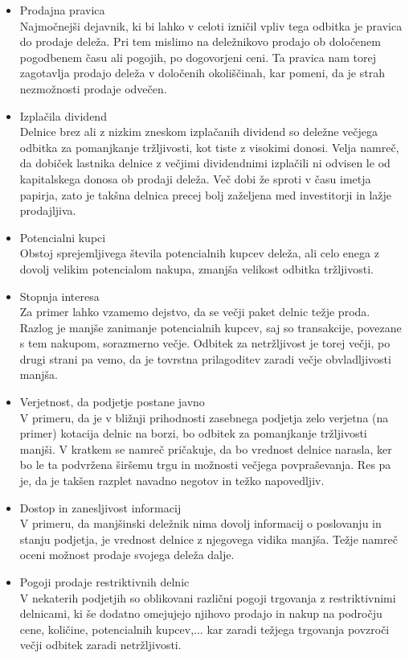 \documentclass[12pt,a4paper]{amsart}
\theoremstyle{definition} %
\theoremstyle{plain} %
\begin{document}
\begin{itemize}
\item Prodajna pravica\\
Najmočnejši dejavnik, ki bi lahko v celoti izničil vpliv tega odbitka je pravica do prodaje deleža. Pri tem mislimo na deležnikovo prodajo ob določenem pogodbenem času ali pogojih, po dogovorjeni ceni. Ta pravica nam torej zagotavlja prodajo deleža v določenih okoliščinah, kar pomeni, da je strah nezmožnosti prodaje odvečen. 
\item Izplačila dividend\\
Delnice brez ali z nizkim zneskom izplačanih dividend so deležne večjega odbitka za pomanjkanje tržljivosti, kot tiste z visokimi donosi. Velja namreč, da dobiček lastnika delnice z večjimi dividendnimi izplačili ni odvisen le od kapitalskega donosa ob prodaji deleža. Več dobi že sproti v času imetja papirja, zato je takšna delnica precej bolj zaželjena med investitorji in lažje prodajljiva. 
\item Potencialni kupci\\
Obstoj sprejemljivega števila potencialnih kupcev deleža, ali celo enega z dovolj velikim potencialom nakupa, zmanjša velikost odbitka tržljivosti. 
\item Stopnja interesa\\
Za primer lahko vzamemo dejstvo, da se večji paket delnic težje proda. Razlog je manjše zanimanje potencialnih kupcev, saj so transakcije, povezane s tem nakupom, sorazmerno večje. Odbitek za netržljivost je torej večji, po drugi strani pa vemo, da je tovrstna prilagoditev zaradi večje obvladljivosti manjša. 
\item Verjetnost, da podjetje postane javno\\
V primeru, da je v bližnji prihodnosti zasebnega podjetja zelo verjetna (na primer) kotacija delnic na borzi, bo odbitek za pomanjkanje tržljivosti manjši. V kratkem se namreč pričakuje, da bo vrednost delnice narasla, ker bo le ta podvržena širšemu trgu in možnosti večjega povpraševanja. Res pa je, da je takšen razplet navadno negotov in težko napovedljiv.
\item Dostop in zanesljivost informacij\\
V primeru, da manjšinski deležnik nima dovolj informacij o poslovanju in stanju podjetja, je vrednost delnice z njegovega vidika manjša. Težje namreč oceni možnost prodaje svojega deleža dalje.
\item Pogoji prodaje restriktivnih delnic\\
V nekaterih podjetjih so oblikovani različni pogoji trgovanja z restriktivnimi delnicami, ki še dodatno omejujejo njihovo prodajo in nakup na področju cene, količine, potencialnih kupcev,... kar zaradi težjega trgovanja povzroči večji odbitek zaradi netržljivosti.

\end{itemize}
\end{document}
